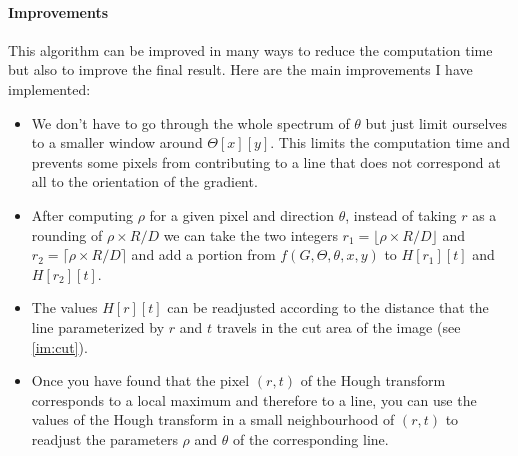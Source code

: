 \documentclass[11pt]{article}
\begin{document}
	\paragraph{Improvements}
	This algorithm can be improved in many ways to reduce the computation time but also to improve the final result. Here are the main improvements I have implemented:
	\begin{itemize}
		\item We don't have to go through the whole spectrum of $\theta$ but just limit ourselves to a smaller window around $\Theta[x][y]$. This limits the computation time and prevents some pixels from contributing to a line that does not correspond at all to the orientation of the gradient.
		\item After computing $\rho$ for a given pixel and direction $\theta$, instead of taking $r$ as a rounding of $\rho \times R/D$ we can take the two integers $r_1 = \lfloor \rho \times R/D \rfloor$ and $r_2 = \lceil \rho \times R/D \rceil$ and add a portion from $f(G, \Theta, \theta, x, y)$ to $H[r_1][t]$ and $H[r_2][t]$.
		\item The values $H[r][t]$ can be readjusted according to the distance that the line parameterized by $r$ and $t$ travels in the cut area of the image (see \figurename \ref{im:cut}).
		\item Once you have found that the pixel $(r, t)$ of the Hough transform corresponds to a local maximum and therefore to a line, you can use the values of the Hough transform in a small neighbourhood of $(r, t)$ to readjust the parameters $\rho$ and $\theta$ of the corresponding line.
	\end{itemize}
	
\end{document}

